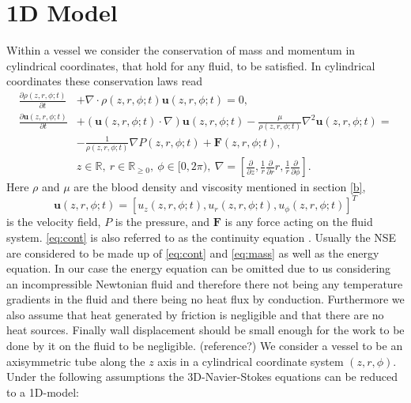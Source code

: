 \documentclass[a4paper, oneside]{discothesis}
\begin{document}
\section{1D Model} \label{sec:sv}
Within a vessel we consider the conservation of mass and momentum in cylindrical coordinates, that hold for any fluid, to be satisfied.
In cylindrical coordinates these conservation laws read
\begin{align}
	\frac{\partial \rho (z,r,\phi; t)}{\partial t} &+ \nabla \cdot \rho (z,r,\phi; t)\mathbf{u}(z,r,\phi; t) = 0, \label{eq:cont}\\
	\frac{\partial \mathbf{u}(z,r,\phi; t)}{\partial t} &+ \left( \mathbf{u}(z,r,\phi; t) \cdot \nabla \right) \mathbf{u}(z,r,\phi; t) - \frac{\mu}{\rho(z,r,\phi; t)} \nabla^2 \mathbf{u}(z,r,\phi; t) = \\
														&- \frac{1}{\rho (z,r,\phi; t)} \nabla P(z,r,\phi; t) + \mathbf{F}(z,r,\phi; t), \label{eq:mass} \\
														&z \in \mathbb{R}, \ r \in \mathbb{R}_{\geq 0}, \ \phi \in [0, 2\pi), \ \nabla = \left[\frac{\partial}{\partial z}, \frac{1}{r}\frac{\partial}{\partial r}r, \frac{1}{r}\frac{\partial}{\partial \phi}  \right].
\end{align}
Here $\rho$ and $\mu$ are the blood density and viscosity mentioned in section \ref{b}, 
\begin{equation}
	\mathbf{u}(z,r,\phi; t) = \left[ u_z(z,r,\phi; t), u_r(z,r,\phi; t), u_\phi (z,r,\phi; t) \right]^T
\end{equation}
	is the velocity field, $P$ is the pressure, and $\mathbf{F}$ is any force acting on the fluid system.
\autoref{eq:cont} is also referred to as the continuity equation \cite{anderson2011ebook}.
Usually the NSE are considered to be made up of \autoref{eq:cont} and \autoref{eq:mass} as well as the energy equation.
In our case the energy equation can be omitted due to us considering an incompressible Newtonian fluid and therefore there not being any temperature gradients in the fluid and there being no heat flux by conduction.
Furthermore we also assume that heat generated by friction is negligible and that there are no heat sources.
Finally wall displacement should be small enough for the work to be done by it on the fluid to be negligible. (reference?)
We consider a vessel to be an axisymmetric tube along the $z$ axis in a cylindrical coordinate system $\left(z,r,\phi\right)$.
Under the following assumptions the 3D-Navier-Stokes equations can be reduced to a 1D-model:
\end{document}
